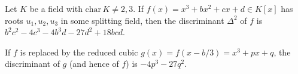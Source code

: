 Let $K$ be a field with $\mathrm{char}\,K \neq 2,3$. If $f(x) = x^3 + bx^2 + cx + d \in K[x]$ has roots $u_1, u_2, u_3$ in some splitting field, then the discriminant $\Delta^2$ of $f$ is $b^2c^2 - 4c^3 - 4b^3d - 27d^2 + 18bcd$.

If $f$ is replaced by the reduced cubic $g(x) = f(x - b/3) = x^3 + px + q$, the discriminant of $g$ (and hence of $f$) is $-4p^3 - 27q^2$.
